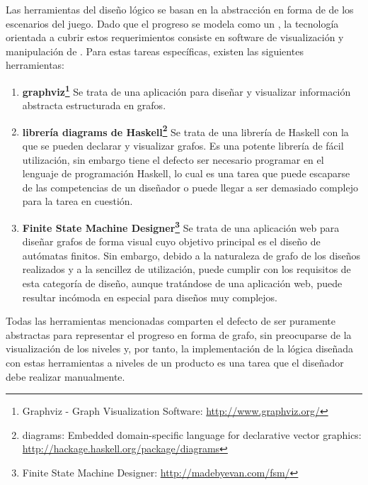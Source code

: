 Las herramientas del diseño lógico se basan en la abstracción en forma de  de los escenarios del juego.
Dado que el progreso se modela como un , la tecnología orientada a cubrir estos requerimientos consiste en software de visualización y manipulación de . Para estas tareas específicas, existen las siguientes herramientas:
\begin{enumerate}
	\item \textbf{graphviz\footnote{Graphviz - Graph Visualization Software: \url{http://www.graphviz.org/}}} Se trata de una aplicación para diseñar y visualizar información abstracta estructurada en grafos.
	\item \textbf{librería diagrams de Haskell\footnote{diagrams: Embedded domain-specific language for declarative vector graphics: \url{http://hackage.haskell.org/package/diagrams}}} Se trata de una librería de Haskell con la que se pueden declarar y visualizar grafos. Es una potente librería de fácil utilización, sin embargo tiene el defecto ser necesario programar en el lenguaje de programación Haskell, lo cual es una tarea que puede escaparse de las competencias de un diseñador o puede llegar a ser demasiado complejo para la tarea en cuestión.
	\item \textbf{Finite State Machine Designer\footnote{Finite State Machine Designer: \url{http://madebyevan.com/fsm/}}} Se trata de una aplicación web para diseñar grafos de forma visual cuyo objetivo principal es el diseño de autómatas finitos. Sin embargo, debido a la naturaleza de grafo de los diseños realizados y a la sencillez de utilización, puede cumplir con los requisitos de esta categoría de diseño, aunque tratándose de una aplicación web, puede resultar incómoda en especial para diseños muy complejos.
\end{enumerate}
Todas las herramientas mencionadas comparten el defecto de ser puramente abstractas para representar el progreso en forma de grafo, sin preocuparse de la visualización de los niveles y, por tanto, la implementación de la lógica diseñada con estas herramientas a niveles de un producto es una tarea que el diseñador debe realizar manualmente.